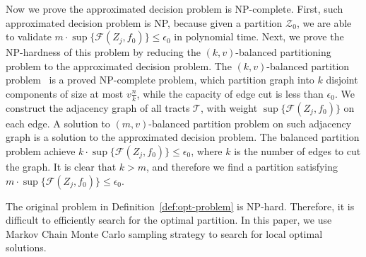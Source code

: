 Now we prove the approximated decision problem is NP-complete. First, such approximated decision problem is NP, because given a partition $\mathcal{Z}_0$, we are able to validate $m \cdot \sup \{ \mathcal{F}(Z_j, f_0)\} \leq \epsilon_0$ in polynomial time. Next, we prove the NP-hardness of this problem by reducing the $(k,v)$-balanced partitioning problem to the approximated decision problem. The $(k,v)$-balanced partition problem~\cite{andreev2006balanced} is a proved NP-complete problem, which partition graph into $k$ disjoint components of size at most $v\frac{n}{k}$, while the capacity of edge cut is less than $\epsilon_0$. We construct the adjacency graph of all tracts $\mathcal{T}$, with weight $\sup \{\mathcal{F}(Z_j, f_0) \}$ on each edge. A solution to $(m,v)$-balanced partition problem on such adjacency graph is a solution to the approximated decision problem. The balanced partition problem achieve $k \cdot \sup \{\mathcal{F}(Z_j, f_0) \} \leq \epsilon_0$, where $k$ is the number of edges to cut the graph. It is clear that $k > m$, and therefore we find a partition satisfying $m \cdot \sup \{ \mathcal{F}(Z_j, f_0)\} \leq \epsilon_0$. 

The original problem in Definition~\ref{def:opt-problem} is NP-hard. Therefore, it is difficult to efficiently search for the optimal partition. In this paper, we use Markov Chain Monte Carlo sampling strategy to search for local optimal solutions.
